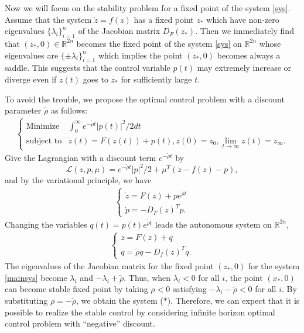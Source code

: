 \documentclass[11pt,reqno]{amsart}
\begin{document}
Now we will focus on the stability problem for a fixed point of the system \eqref{sys}. Assume that the system $\dot{z}=f(z)$ has a fixed point $z_*$ which have non-zero eigenvalues $\{\lambda_i\}_{i=1}^n$ of the Jacobian matrix $D_F(z_*)$. Then we immediately find that $(z_*,0)\in\mathbb{R}^{2n}$ becomes the fixed point of the system \eqref{sys} on $\mathbb{R}^{2n}$ whose eigenvalues are $\{\pm\lambda_i\}_{i=1}^n$ which implies the point $(z_*,0)$ becomes always a saddle. This suggests that the control variable $p(t)$ may extremely increase or diverge even if $z(t)$ goes to $z_*$ for sufficiently large $t$.

To avoid the trouble, we propose the optimal control problem with a discount parameter $\tilde{\rho}$ as follows:
\begin{eqnarray}
\begin{cases}\label{discountcontrol}
\text{Minimize} & \int_0^\infty e^{-\tilde{\rho}t}|p(t)|^2/2 dt \\
\text{subject to} & \dot{z}(t)=F(z(t))+p(t), z(0)=z_0, \displaystyle \lim_{t\to\infty}z(t)=z_\infty.
\end{cases}
\end{eqnarray}
Give the Lagrangian with a discount term $e^{-\tilde{\rho} t}$ by
$$
\mathcal{L}(z,p,\mu)=e^{-\tilde{\rho} t}|p|^2/2+\mu^T(\dot{z}-f(z)-p),
$$
and by the variational principle, we have
\begin{eqnarray}
\begin{cases}
\dot{z}=F(z)+p e^{\tilde{\rho} t}\\
\dot{p}=-D_F(z)^Tp.
\end{cases}\nonumber
\end{eqnarray}
Changing the variables $q(t)=p(t)e^{\tilde{\rho} t}$ leads the autonomous system on $\mathbb{R}^{2n}$,
\begin{eqnarray}\label{mainsys}
\begin{cases}
\dot{z}=F(z)+q\\
\dot{q}=\tilde{\rho} q -D_f(z)^T q.
\end{cases}
\end{eqnarray}
The eigenvalues of the Jacobian matrix for the fixed point $(z_*,0)$ for the system \eqref{mainsys} become $\lambda_i$ and $-\lambda_i+\tilde{\rho}$. Thus, when $\lambda_i<0$ for all $i$, the point $(x_*,0)$ can become stable fixed point by taking $\rho<0$ satisfying $-\lambda_i-\tilde{\rho}<0$ for all $i$. By substituting $\rho=-\tilde{\rho}$, we obtain the system ($\ast$). Therefore, we can expect that it is possible to realize the stable control by considering infinite horizon optimal control problem with ``negative'' discount.
\end{document}
